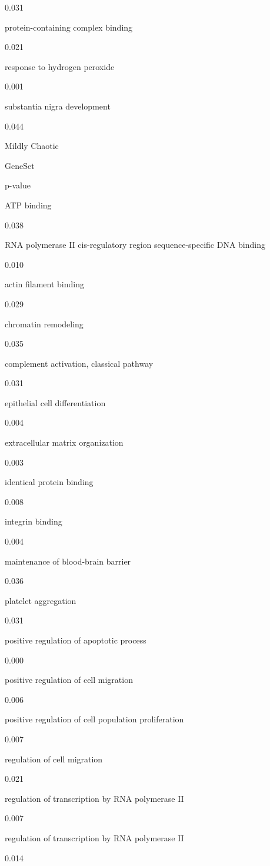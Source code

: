 \documentclass[
  letterpaper,
  DIV=11,
  numbers=noendperiod,
  openany,
  oneside]{scrreprt}
\begin{document}
0.031

protein-containing complex binding

0.021

response to hydrogen peroxide

0.001

substantia nigra development

0.044

Mildly Chaotic

GeneSet

p-value

ATP binding

0.038

RNA polymerase II cis-regulatory region sequence-specific DNA binding

0.010

actin filament binding

0.029

chromatin remodeling

0.035

complement activation, classical pathway

0.031

epithelial cell differentiation

0.004

extracellular matrix organization

0.003

identical protein binding

0.008

integrin binding

0.004

maintenance of blood-brain barrier

0.036

platelet aggregation

0.031

positive regulation of apoptotic process

0.000

positive regulation of cell migration

0.006

positive regulation of cell population proliferation

0.007

regulation of cell migration

0.021

regulation of transcription by RNA polymerase II

0.007

regulation of transcription by RNA polymerase II

0.014
\end{document}
